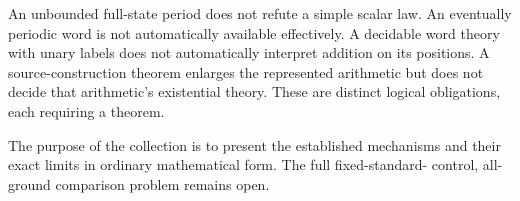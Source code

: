 \documentclass[11pt,a4paper]{article}
\begin{document}
An unbounded full-state period does not refute a simple scalar law.  An
eventually periodic word is not automatically available effectively.  A
decidable word theory with unary labels does not automatically interpret
addition on its positions.  A source-construction theorem enlarges the
represented arithmetic but does not decide that arithmetic's existential
theory.  These are distinct logical obligations, each requiring a theorem.

The purpose of the collection is to present the established mechanisms and
their exact limits in ordinary mathematical form.  The full fixed-standard-
control, all-ground comparison problem remains open.


\end{document}

